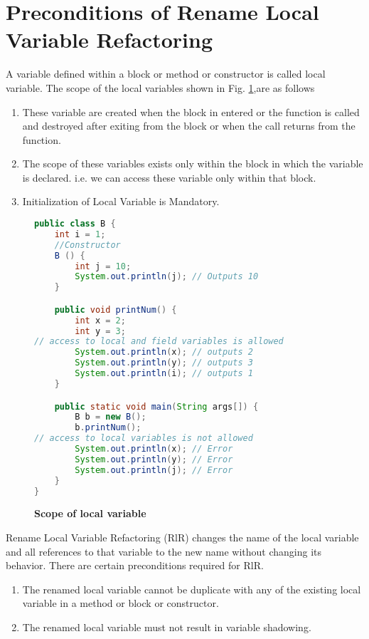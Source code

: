 \section{\textbf{Preconditions of Rename Local Variable Refactoring}}
A variable defined within a block or method or constructor is called local variable.
The scope of the local variables shown in Fig. \ref{figure:precond5_4},are as follows
\begin{enumerate}
\item These variable are created when the block in entered or the function is called and destroyed after exiting from the block or when the call returns from the function.
\item The scope of these variables exists only within the block in which the variable is declared. i.e. we can access these variable only within that block.
\item Initialization of Local Variable is Mandatory.
\end{enumerate}

\begin{figure}[th]
\centering
\begin{minipage}[t]{0.95\linewidth}
\begin{lstlisting}[language=java, basicstyle=\scriptsize\ttfamily,frame=single]
public class B {
	int i = 1;
	//Constructor
	B () {
	    int j = 10;
	    System.out.println(j); // Outputs 10
	}

	public void printNum() {
		int x = 2;
		int y = 3;
// access to local and field variables is allowed
		System.out.println(x); // outputs 2
		System.out.println(y); // outputs 3
		System.out.println(i); // outputs 1
	}

	public static void main(String args[]) {
		B b = new B();
		b.printNum();
// access to local variables is not allowed
		System.out.println(x); // Error
		System.out.println(y); // Error
		System.out.println(j); // Error
	}
}
\end{lstlisting}
\end{minipage}
\caption{\textbf{Scope of local variable}}
\label{figure:precond5_4}
\end{figure}

Rename Local Variable Refactoring (RlR) changes the name of the local variable and all references to that variable to the new name without changing its behavior. There are certain preconditions required for RlR.
\begin{enumerate}
\item The renamed local variable cannot be duplicate with any of the existing local variable in a method or block or constructor.
\item The renamed local variable must not result in variable shadowing.
\end{enumerate}

